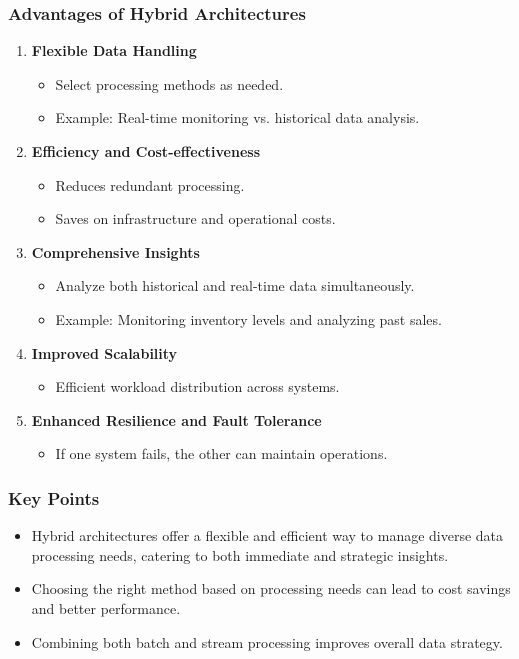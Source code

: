 \documentclass[aspectratio=169]{beamer}
\begin{document}
\begin{frame}[fragile]
    \frametitle{Advantages of Hybrid Architectures}
    \begin{enumerate}
        \item \textbf{Flexible Data Handling}
            \begin{itemize}
                \item Select processing methods as needed.
                \item Example: Real-time monitoring vs. historical data analysis.
            \end{itemize}
        
        \item \textbf{Efficiency and Cost-effectiveness}
            \begin{itemize}
                \item Reduces redundant processing.
                \item Saves on infrastructure and operational costs.
            \end{itemize}
        
        \item \textbf{Comprehensive Insights}
            \begin{itemize}
                \item Analyze both historical and real-time data simultaneously.
                \item Example: Monitoring inventory levels and analyzing past sales.
            \end{itemize}

        \item \textbf{Improved Scalability}
            \begin{itemize}
                \item Efficient workload distribution across systems.
            \end{itemize}

        \item \textbf{Enhanced Resilience and Fault Tolerance}
            \begin{itemize}
                \item If one system fails, the other can maintain operations.
            \end{itemize}
    \end{enumerate}
\end{frame}

\begin{frame}[fragile]
    \frametitle{Key Points}
    \begin{itemize}
        \item Hybrid architectures offer a flexible and efficient way to manage diverse data processing needs, catering to both immediate and strategic insights.
        \item Choosing the right method based on processing needs can lead to cost savings and better performance.
        \item Combining both batch and stream processing improves overall data strategy.
    \end{itemize}
\end{frame}
\end{document}
